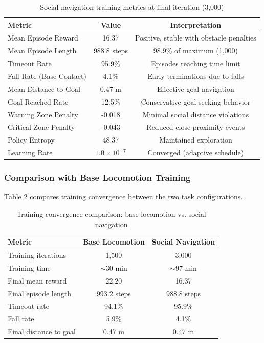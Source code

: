 \documentclass[12pt,a4paper]{article}
\begin{document}
\begin{table}[htbp]
\centering
\caption{Social navigation training metrics at final iteration (3,000)}
\label{tab:social_nav_training_metrics}
\begin{tabular}{lcc}
\toprule
\textbf{Metric} & \textbf{Value} & \textbf{Interpretation} \\
\midrule
Mean Episode Reward & 16.37 & Positive, stable with obstacle penalties \\
Mean Episode Length & 988.8 steps & 98.9\% of maximum (1,000) \\
Timeout Rate & 95.9\% & Episodes reaching time limit \\
Fall Rate (Base Contact) & 4.1\% & Early terminations due to falls \\
Mean Distance to Goal & 0.47 m & Effective goal navigation \\
Goal Reached Rate & 12.5\% & Conservative goal-seeking behavior \\
Warning Zone Penalty & -0.018 & Minimal social distance violations \\
Critical Zone Penalty & -0.043 & Reduced close-proximity events \\
Policy Entropy & 48.37 & Maintained exploration \\
Learning Rate & $1.0 \times 10^{-7}$ & Converged (adaptive schedule) \\
\bottomrule
\end{tabular}
\end{table}

\subsubsection{Comparison with Base Locomotion Training}

Table \ref{tab:training_comparison} compares training convergence between the two task configurations.

\begin{table}[htbp]
\centering
\caption{Training convergence comparison: base locomotion vs. social navigation}
\label{tab:training_comparison}
\begin{tabular}{lcc}
\toprule
\textbf{Metric} & \textbf{Base Locomotion} & \textbf{Social Navigation} \\
\midrule
Training iterations & 1,500 & 3,000 \\
Training time & $\sim$30 min & $\sim$97 min \\
Final mean reward & 22.20 & 16.37 \\
Final episode length & 993.2 steps & 988.8 steps \\
Timeout rate & 94.1\% & 95.9\% \\
Fall rate & 5.9\% & 4.1\% \\
Final distance to goal & 0.47 m & 0.47 m \\
\bottomrule
\end{tabular}
\end{table}
\end{document}
